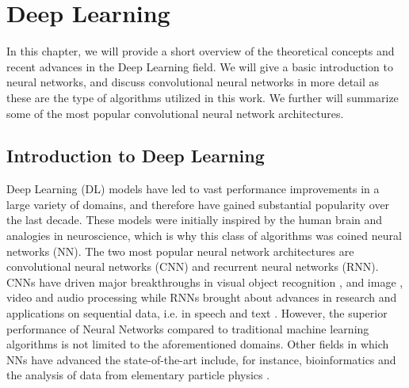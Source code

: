 
\chapter{Deep Learning} %

\label{Chapter3} %


In this chapter, we will provide a short overview of the theoretical concepts and recent advances in the Deep Learning field. We will give a basic introduction to neural networks, and discuss convolutional neural networks in more detail as these are the type of algorithms utilized in this work. We further will summarize some of the most popular convolutional neural network architectures.




\section{Introduction to Deep Learning}

Deep Learning (DL) models have led to vast performance improvements in a large variety of domains, and therefore have gained substantial popularity over the last decade. These models were initially inspired by the human brain and analogies in neuroscience, which is why this class of algorithms was coined neural networks (NN). The two most popular neural network architectures are convolutional neural networks (CNN) and recurrent neural networks (RNN). CNNs have driven major breakthroughs in visual object recognition \parencite{krizhevsky2012}, and image \parencite{zhang2015}, video \parencite{tompson2014} and audio \parencite{hinton2012} processing while RNNs brought about advances in research and applications on sequential data, i.e. in speech and text \parencite{collobert2011}. However, the superior performance of Neural Networks compared to traditional machine learning algorithms is not limited to the aforementioned domains. Other fields in which NNs have advanced the state-of-the-art include, for instance, bioinformatics \parencite{junshui2015} and the analysis of data from elementary particle physics \parencite{ciodaroc2012}.

